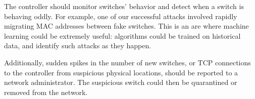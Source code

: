 The controller should monitor switches' behavior and detect when a switch is behaving oddly. For example, one of our successful attacks involved rapidly migrating MAC addresses between fake switches. This is an are where machine learning could be extremely useful: algorithms could be trained on historical data, and identify such attacks as they happen. 

Additionally, sudden spikes in the number of new switches, or TCP connections to the controller from suspicious physical locations, should be reported to a network administrator. The suspicious switch could then be quarantined or removed from the network.